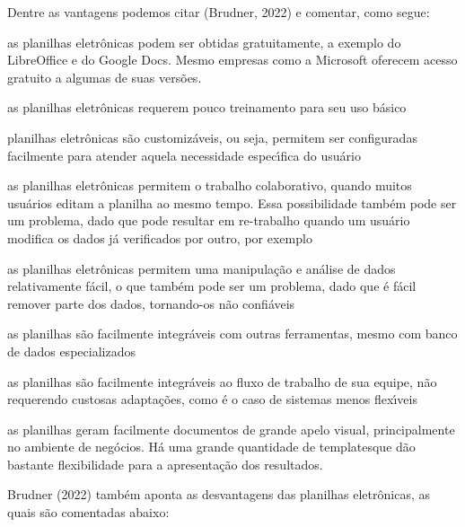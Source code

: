 \documentclass[
12pt,		%
openright,	%
twoside,  %
a4paper,			%
chapter=TITLE,		%
english,			%
french,				%
spanish,			%
brazil				%
]{USPSC-classe/USPSC}
\begin{document}
Dentre as vantagens podemos citar (Brudner, 2022) e comentar, como segue:











\begin{alineas}
\item as planilhas eletr\^onicas podem ser obtidas gratuitamente, a exemplo do LibreOffice e do Google Docs. Mesmo empresas como a Microsoft oferecem acesso gratuito a algumas de suas vers\~oes.
\item as planilhas eletr\^onicas requerem pouco treinamento para seu uso b\'asico
\item planilhas eletr\^onicas s\~ao \textquotedbl customiz\'aveis\textquotedbl , ou seja, permitem ser configuradas facilmente para atender aquela necessidade espec\'{\i}fica do usu\'ario
\item as planilhas eletr\^onicas permitem o trabalho colaborativo, quando muitos usu\'arios editam a planilha ao mesmo tempo. Essa possibilidade tamb\'em pode ser um problema, dado que pode resultar em re-trabalho quando um usu\'ario modifica os dados j\'a verificados por outro, por exemplo
\item as planilhas eletr\^onicas permitem uma manipula\c{c}\~ao e an\'alise de dados relativamente f\'acil, o que tamb\'em pode ser um problema, dado que \'e f\'acil remover parte dos dados, tornando-os n\~ao confi\'aveis
\item as planilhas s\~ao facilmente integr\'aveis com outras  ferramentas, mesmo com banco de dados especializados
\item as planilhas s\~ao facilmente integr\'aveis ao fluxo de trabalho de sua equipe, n\~ao requerendo custosas adapta\c{c}\~oes, como \'e o caso de sistemas menos flex\'{\i}veis
\item as planilhas geram facilmente documentos de grande apelo visual, principalmente no ambiente de neg\'ocios. H\'a uma grande quantidade de \textquotedbl templates\textquotedbl  que d\~ao bastante flexibilidade para a apresenta\c{c}\~ao dos resultados.
\end{alineas}

 Brudner (2022) tamb\'em aponta as desvantagens das planilhas eletr\^onicas, as quais s\~ao comentadas abaixo:
\end{document}
